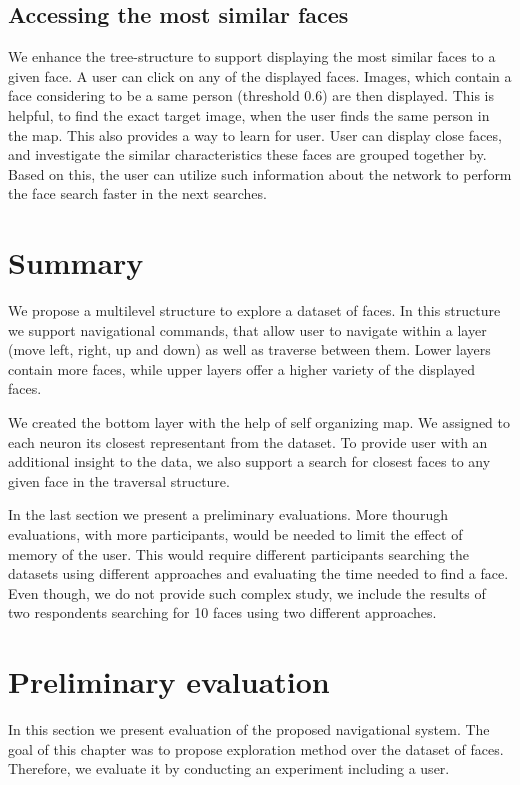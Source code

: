 \subsection{Accessing the most similar faces}

We enhance the tree-structure to support displaying the most similar faces to a given face. A user can click on any of the displayed faces. Images, which contain a face considering to be a same person (threshold 0.6) are then displayed. This is helpful, to find the exact target image, when the user finds the same person in the map. This also provides a way to learn for user. User can display close faces, and investigate the similar characteristics these faces are grouped together by. Based on this, the user can utilize such information about the network to perform the face search faster in the next searches.

\section{Summary}

We propose a multilevel structure to explore a dataset of faces. In this structure we support navigational commands, that allow user to navigate within a layer (move left, right, up and down) as well as traverse between them. Lower layers contain more faces, while upper layers offer a higher variety of the displayed faces.

We created the bottom layer with the help of self organizing map. We assigned to each neuron its closest representant from the dataset. To provide user with an additional insight to the data, we also support a search for closest faces to any given face in the traversal structure.

In the last section we present a preliminary evaluations. More thourugh evaluations, with more participants, would be needed to limit the effect of memory of the user. This would require different participants searching the datasets using different approaches and evaluating the time needed to find a face. Even though, we do not provide such complex study, we include the results of two respondents searching for 10 faces using two different approaches.

\section{Preliminary evaluation}

In this section we present evaluation of the proposed navigational system. The goal of this chapter was to propose exploration method over the dataset of faces. Therefore, we evaluate it by conducting an experiment including a user.

